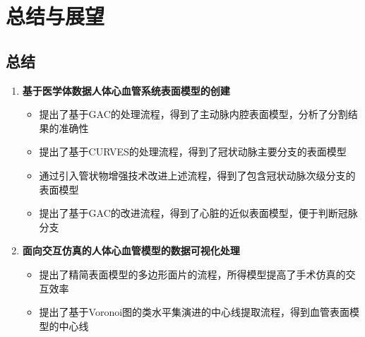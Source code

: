 \section{总结与展望}

\subsection{总结}
\begin{frame}
\begin{enumerate}
\item \textbf{基于医学体数据人体心血管系统表面模型的创建}
\begin{itemize}
\pause \item 提出了基于GAC的处理流程，得到了主动脉内腔表面模型，分析了分割结果的准确性
\pause \item 提出了基于CURVES的处理流程，得到了冠状动脉主要分支的表面模型
\pause \item 通过引入管状物增强技术改进上述流程，得到了包含冠状动脉次级分支的表面模型
\pause \item 提出了基于GAC的改进流程，得到了心脏的近似表面模型，便于判断冠脉分支
\end{itemize}
\pause \item \textbf{面向交互仿真的人体心血管模型的数据可视化处理}
\begin{itemize}
\pause \item 提出了精简表面模型的多边形面片的流程，所得模型提高了手术仿真的交互效率
\pause \item 提出了基于Voronoi图的类水平集演进的中心线提取流程，得到血管表面模型的中心线
\end{itemize}
\end{enumerate}
\end{frame}

